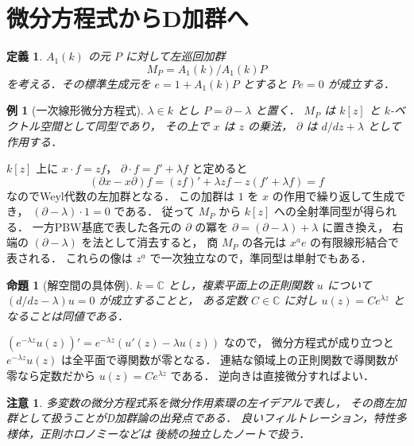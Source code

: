 \documentclass[a5paper,10pt,onecolumn]{jsarticle}
\makeatletter
\theoremstyle{mathnotetheorem}
\newtheorem{definition}[theorem]{定義}
\newtheorem{proposition}[theorem]{命題}
\newtheorem{example}[theorem]{例}
\newtheorem{remark}[theorem]{注意}
\renewcommand{\proofname}{証明}
\renewenvironment{proof}[1][\proofname]{%
  \par\pushQED{\qed}\normalfont\topsep4\p@\@plus2\p@\relax
  \trivlist\item[\hskip\labelsep\bfseries #1]\ignorespaces
}{\popQED\endtrivlist\@endpefalse}
\makeatother
\begin{document}
\section{微分方程式からD加群へ}
\begin{definition}
$A_1(k)$ の元 $P$ に対して左巡回加群
\[
 M_P=A_1(k)/A_1(k)P
\]
を考える．その標準生成元を $e=1+A_1(k)P$ とすると
$Pe=0$ が成立する．
\end{definition}
\begin{example}[一次線形微分方程式]
$\lambda\in k$ とし
$P=\partial-\lambda$ と置く．
$M_P$ は $k[z]$ と $k$-ベクトル空間として同型であり，
その上で $x$ は $z$ の乗法，
$\partial$ は $d/dz+\lambda$ として作用する．
\end{example}
\begin{proof}
$k[z]$ 上に $x\cdot f=zf$，
$\partial\cdot f=f'+\lambda f$ と定めると
\[
 (\partial x-x\partial)f
 =(zf)'+\lambda zf-z(f'+\lambda f)=f
\]
なのでWeyl代数の左加群となる．
この加群は $1$ を $x$ の作用で繰り返して生成でき，
$(\partial-\lambda)\cdot1=0$ である．
従って $M_P$ から $k[z]$ への全射準同型が得られる．
一方PBW基底で表した各元の $\partial$ の冪を
$\partial=(\partial-\lambda)+\lambda$ に置き換え，
右端の $(\partial-\lambda)$ を法として消去すると，
商 $M_P$ の各元は $x^a e$ の有限線形結合で表される．
これらの像は $z^a$ で一次独立なので，準同型は単射でもある．
\end{proof}
\begin{proposition}[解空間の具体例]
$k=\mathbb C$ とし，複素平面上の正則関数 $u$ について
$(d/dz-\lambda)u=0$ が成立することと，
ある定数 $C\in\mathbb C$ に対し
$u(z)=Ce^{\lambda z}$ となることは同値である．
\end{proposition}
\begin{proof}
$(e^{-\lambda z}u(z))'
 =e^{-\lambda z}(u'(z)-\lambda u(z))$ なので，
微分方程式が成り立つと
$e^{-\lambda z}u(z)$ は全平面で導関数が零となる．
連結な領域上の正則関数で導関数が零なら定数だから
$u(z)=Ce^{\lambda z}$ である．
逆向きは直接微分すればよい．
\end{proof}
\begin{remark}
多変数の微分方程式系を微分作用素環の左イデアルで表し，
その商左加群として扱うことがD加群論の出発点である．
良いフィルトレーション，特性多様体，正則ホロノミーなどは
後続の独立したノートで扱う．
\end{remark}
\end{document}
